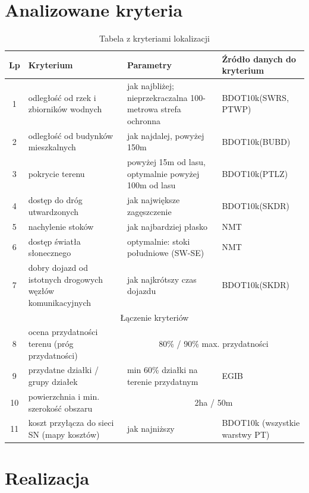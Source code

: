 \documentclass{article}
\begin{document}
\section{Analizowane kryteria}

\begin{table}[h!]
    \centering
    \renewcommand{\arraystretch}{1.4}
    \begin{tabular}{|c|p{4cm}|p{5cm}|p{3.5cm}|}
    \hline
    \textbf{Lp} & \textbf{Kryterium} & \textbf{Parametry} & \textbf{Źródło danych do kryterium} \\ \hline
    1 & odległość od rzek i zbiorników wodnych & jak najbliżej; nieprzekraczalna 100-metrowa strefa ochronna & BDOT10k(SWRS, PTWP)\\ \hline
    2 & odległość od budynków mieszkalnych & jak najdalej, powyżej 150m & BDOT10k(BUBD)\\ \hline
    3 & pokrycie terenu & powyżej 15m od lasu, optymalnie powyżej 100m od lasu & BDOT10k(PTLZ)\\ \hline
    4 & dostęp do dróg utwardzonych & jak największe zagęszczenie & BDOT10k(SKDR)\\ \hline
    5 & nachylenie stoków & jak najbardziej płasko & NMT\\ \hline
    6 & dostęp światła słonecznego & optymalnie: stoki południowe (SW-SE) & NMT\\ \hline
    7 & dobry dojazd od istotnych drogowych węzłów komunikacyjnych & jak najkrótszy czas dojazdu & BDOT10k(SKDR)\\ \hline
    \multicolumn{4}{|c|}{Łączenie kryteriów} \\ \hline
    8 & ocena przydatności terenu (próg przydatności) & \multicolumn{2}{|c|}{80\% / 90\% max. przydatności}\\ \hline
    9 & przydatne działki / grupy działek & min 60\% działki na terenie przydatnym & EGIB \\ \hline
    10 & powierzchnia i min. szerokość obszaru & \multicolumn{2}{|c|}{2ha / 50m}\\ \hline
    11 & koszt przyłącza do sieci SN (mapy kosztów) & jak najniższy & BDOT10k (wszystkie warstwy PT)\\ \hline
    \end{tabular}
    \caption{Tabela z kryteriami lokalizacji}
    \label{tab:kryteria}
    \end{table}
\newpage

\section{Realizacja}
\end{document}
